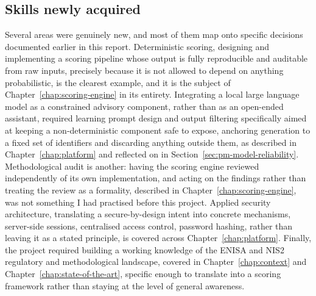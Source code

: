 \subsection{Skills newly acquired}
\label{sec:pm-skills-acquired}

Several areas were genuinely new, and most of them map onto specific decisions documented earlier in this report. Deterministic scoring, designing and implementing a scoring pipeline whose output is fully reproducible and auditable from raw inputs, precisely because it is not allowed to depend on anything probabilistic, is the clearest example, and it is the subject of Chapter~\ref{chap:scoring-engine} in its entirety. Integrating a local large language model as a constrained advisory component, rather than as an open-ended assistant, required learning prompt design and output filtering specifically aimed at keeping a non-deterministic component safe to expose, anchoring generation to a fixed set of identifiers and discarding anything outside them, as described in Chapter~\ref{chap:platform} and reflected on in Section~\ref{sec:pm-model-reliability}. Methodological audit is another: having the scoring engine reviewed independently of its own implementation, and acting on the findings rather than treating the review as a formality, described in Chapter~\ref{chap:scoring-engine}, was not something I had practised before this project. Applied security architecture, translating a secure-by-design intent into concrete mechanisms, server-side sessions, centralised access control, password hashing, rather than leaving it as a stated principle, is covered across Chapter~\ref{chap:platform}. Finally, the project required building a working knowledge of the ENISA and NIS2 regulatory and methodological landscape, covered in Chapter~\ref{chap:context} and Chapter~\ref{chap:state-of-the-art}, specific enough to translate into a scoring framework rather than staying at the level of general awareness.